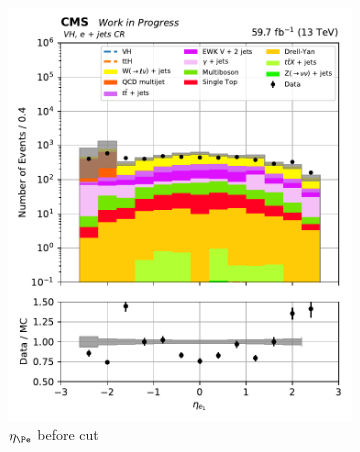 \begin{figure}[htbp]
    \centering
    \begin{subfigure}[b]{0.34\textwidth}
        \includegraphics[width=\textwidth]{figures/hem_issue/region_3/leadLepton_eta_VH_before.pdf}
        \caption{$\eta_{\Pe}$ before cut}
    \end{subfigure}
    \hspace{0.05\textwidth}
    \begin{subfigure}[b]{0.34\textwidth}

\end{subfigure}
\end{figure}
